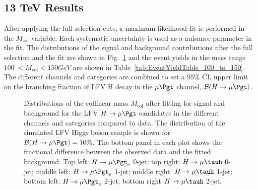 \subsection{13 TeV Results}
After applying the full selection cuts, a maximum likelihood fit is performed in the $M_\text{col}$ variable. Each systematic uncertainty is used as a nuisance parameter in the fit. The distributions of the signal and background contributions after the full selection and the fit are shown in Fig.~\ref{fig:Mcol_SignalRegion} and the
event yields in the mass range $100\:  < M_\text{col} < 150GeV$ are shown in Table~\ref{tab:EventYieldTable_100_to_150}.
The different channels and categories are combined  to set a $95\%$ CL  upper limit on the branching
fraction of LFV H decay in the  $\mu\Pgt$ channel, $\mathcal{B}(H\rightarrow\mu\Pgt)$.

\begin{figure}[hbtp]\centering
\caption{Distributions of the collinear mass $M_\text{col}$ after fitting for signal and background  for the LFV $H \rightarrow \mu \Pgt$ candidates in
the different
channels and categories compared to data.
The distribution of the simulated LFV Higgs boson sample is shown for $\mathcal{B}(H \rightarrow \mu \Pgt )=10\%$.
The bottom panel in each plot shows the fractional difference between the observed data and the fitted background. Top left: $H \rightarrow \mu \Pgt_{e}$ 0-jet; top right: $H \rightarrow \mu \tauh$ 0-jet;
middle left: $H \rightarrow \mu \Pgt_{e}$ 1-jet; middle right: $H \rightarrow \mu \tauh$ 1-jet; bottom left: $H \rightarrow \mu \Pgt_{e}$ 2-jet;
bottom right $H \rightarrow \mu \tauh$ 2-jet.}
 \label{fig:Mcol_SignalRegion}\end{figure}
 
